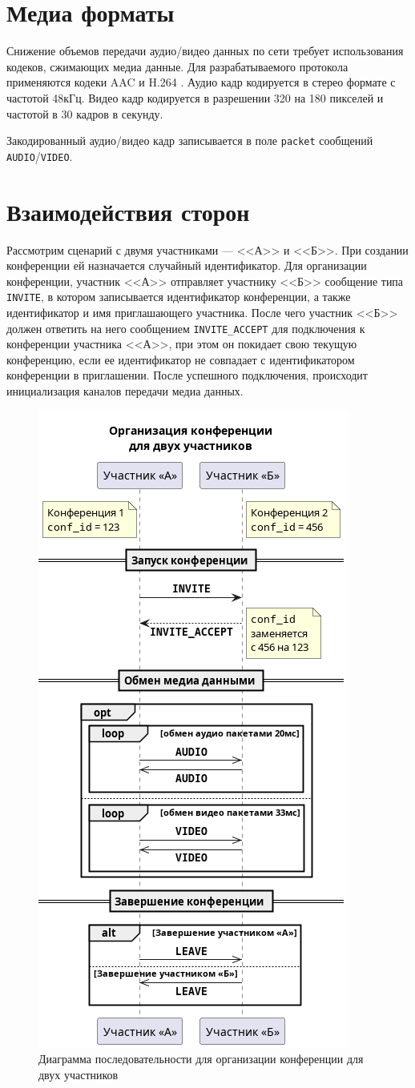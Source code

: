 \section{Медиа форматы}

Снижение объемов передачи аудио/видео данных по сети требует использования кодеков, сжимающих медиа данные. Для разрабатываемого протокола применяются кодеки AAC \cite{aac} и H.264 \cite{h264}. Аудио кадр кодируется в стерео формате с частотой 48кГц. Видео кадр кодируется в разрешении 320 на 180 пикселей и частотой в 30 кадров в секунду.

Закодированный аудио/видео кадр записывается в поле \texttt{packet} сообщений \texttt{AUDIO}/\texttt{VIDEO}.

\section{Взаимодействия сторон}

Рассмотрим сценарий с двумя участниками --- <<А>> и <<Б>>.
При создании конференции ей назначается случайный идентификатор. Для организации конференции, участник <<А>> отправляет участнику <<Б>> сообщение типа \texttt{INVITE}, в котором записывается идентификатор конференции, а также идентификатор и имя приглашающего участника.
После чего участник <<Б>> должен ответить на него сообщением \texttt{INVITE\_ACCEPT} для подключения к конференции участника <<А>>, при этом он покидает свою текущую конференцию, если ее идентификатор не совпадает с идентификатором конференции в приглашении.
После успешного подключения, происходит инициализация каналов передачи медиа данных.

\begin{figure}[H]
  \centering
  \includegraphics[width=0.5\linewidth]{inc/diag/seq-2/conf-2.png}
  \caption{Диаграмма последовательности для организации конференции для двух участников}
  \label{img:conf-2}
\end{figure}

